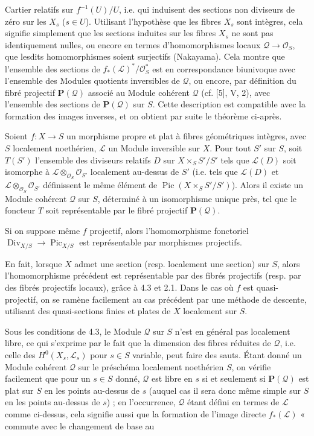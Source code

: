 Cartier relatifs sur $f^{-1}(U)/U$, i.e. qui induisent des sections non
diviseurs de zéro sur les $X_s$ ($s\in U$). Utilisant l'hypothèse que les
fibres $X_s$ sont intègres, cela signifie simplement que les sections induites
sur les fibres $X_s$ ne sont pas identiquement nulles, ou encore en termes
d'homomorphismes locaux $\mathcal Q\longrightarrow\mathcal O_S$, que lesdits
homomorphismes soient surjectifs (Nakayama). Cela montre que l'ensemble des
sections de $f_*(\mathcal L)^*/\mathcal O_S^*$ est en correspondance
biunivoque avec l'ensemble des Modules quotients inversibles de $\mathcal Q$,
ou encore, par définition du fibré projectif $\mathbf P(\mathcal Q)$ associé au
Module cohérent $\mathcal Q$ (cf. [5], V, 2), avec l'ensemble des sections de
$\mathbf P(\mathcal Q)$ sur $S$. Cette description est compatible avec la
formation des images inverses, et on obtient par suite le théorème ci-après.

 Soient $f:X\longrightarrow S$ un morphisme propre et
plat à fibres géométriques intègres, avec $S$ localement noethérien,
$\mathcal L$ un Module inversible sur $X$. Pour tout $S'$ sur $S$, soit
$T(S')$ l'ensemble des diviseurs relatifs $D$ sur $X\times_SS'/S'$ tels que
$\mathcal L(D)$ soit isomorphe à
$\mathcal L\otimes_{\mathcal O_S}\mathcal O_{S'}$ localement au-dessus de $S'$
(i.e. tels que $\mathcal L(D)$ et
$\mathcal L\otimes_{\mathcal O_S}\mathcal O_{S'}$ définissent le même élément
de $\operatorname{Pic}(X\times_SS'/S')$). Alors il existe un Module cohérent
$\mathcal Q$ sur $S$, déterminé à un isomorphisme unique près, tel que le
foncteur $T$ soit représentable par le fibré projectif $\mathbf P(\mathcal Q)$.

 Si on suppose même $f$ projectif, alors
l'homomorphisme fonctoriel
$\operatorname{Div}_{X/S}\longrightarrow\operatorname{Pic}_{X/S}$ est
représentable par morphismes projectifs.

En fait, lorsque $X$ admet une section (resp. localement une section) sur $S$,
alors l'homomorphisme précédent est représentable par des fibrés projectifs
(resp. par des fibrés projectifs locaux), grâce à 4.3 et 2.1. Dans le cas où
$f$ est quasi-projectif, on se ramène facilement au cas précédent par une
méthode de descente, utilisant des quasi-sections finies et plates de $X$
localement sur $S$.

 Sous les conditions de 4.3, le Module $\mathcal Q$ sur
$S$ n'est en général pas localement libre, ce qui s'exprime par le fait que la
dimension des fibres réduites de $\mathcal Q$, i.e. celle des
$H^0(X_s,\mathcal L_s)$ pour $s\in S$ variable, peut faire des sauts. Étant
donné un Module cohérent $\mathcal Q$ sur le préschéma localement noethérien
$S$, on vérifie facilement que pour un $s\in S$ donné, $\mathcal Q$ est libre
en $s$ si et seulement si $\mathbf P(\mathcal Q)$ est plat sur $S$ en les
points au-dessus de $s$ (auquel cas il sera donc même simple sur $S$ en les
points au-dessus de $s$) ; en l'occurrence, $\mathcal Q$ étant défini en termes
de $\mathcal L$ comme ci-dessus, cela signifie aussi que la formation de
l'image directe $f_*(\mathcal L)$ « commute avec le changement de base au

